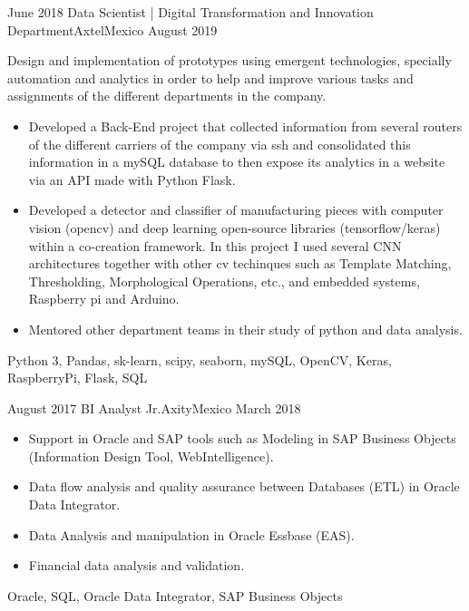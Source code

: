 \begin{experiences}
  
  \experience
    {June 2018} {Data Scientist | Digital Transformation and Innovation Department}{Axtel}{Mexico}
    {August 2019}    {
    			Design and implementation of prototypes using emergent technologies, specially automation
			and analytics in order to help and improve various tasks and assignments of the different departments in the company.
                      \begin{itemize}
                        \item Developed a Back-End project that collected information from several routers
                        of the different carriers of the company via ssh and consolidated this information in a
                        mySQL database to then expose its analytics in a website via an API made with
                        Python Flask.           
                        \item Developed a detector and classifier of manufacturing pieces with computer vision (opencv)
                        and deep learning open-source libraries (tensorflow/keras) within a co-creation framework.
                        In this project I used several CNN architectures together with other cv techinques such as
                        Template Matching, Thresholding, Morphological Operations, etc., and embedded systems, Raspberry pi and Arduino.
                        \item Mentored other department teams in their study of python and data analysis.
                      \end{itemize}
                    }
                    {Python 3, Pandas, sk-learn, scipy, seaborn, mySQL, OpenCV, Keras, RaspberryPi, Flask, SQL}
  \emptySeparator
  
  \experience
    {August 2017} {BI Analyst Jr.}{Axity}{Mexico}
    {March 2018}    {
                      \begin{itemize}
                        \item Support in Oracle and SAP tools such as Modeling in SAP Business Objects (Information Design Tool, WebIntelligence).
                        \item Data flow analysis and quality assurance between Databases (ETL) in Oracle Data Integrator.
                        \item Data Analysis and manipulation in Oracle Essbase (EAS).
                        \item Financial data analysis and validation.
                      \end{itemize}
                    }
                    {Oracle, SQL, Oracle Data Integrator, SAP Business Objects}
  \emptySeparator
  

\end{experiences}
